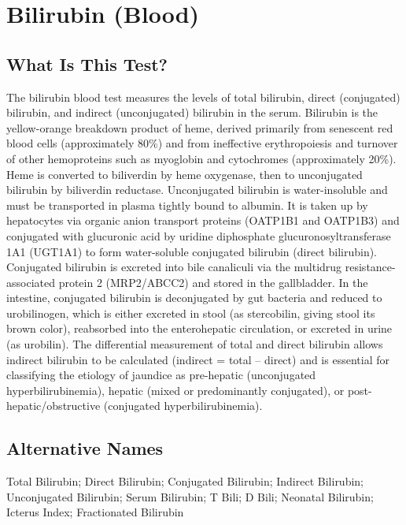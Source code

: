 \chapter{Bilirubin (Blood)}

\section*{What Is This Test?}
The bilirubin blood test measures the levels of total bilirubin, direct (conjugated) bilirubin, and indirect (unconjugated) bilirubin in the serum. Bilirubin is the yellow-orange breakdown product of heme, derived primarily from senescent red blood cells (approximately 80\%) and from ineffective erythropoiesis and turnover of other hemoproteins such as myoglobin and cytochromes (approximately 20\%). Heme is converted to biliverdin by heme oxygenase, then to unconjugated bilirubin by biliverdin reductase. Unconjugated bilirubin is water-insoluble and must be transported in plasma tightly bound to albumin. It is taken up by hepatocytes via organic anion transport proteins (OATP1B1 and OATP1B3) and conjugated with glucuronic acid by uridine diphosphate glucuronosyltransferase 1A1 (UGT1A1) to form water-soluble conjugated bilirubin (direct bilirubin). Conjugated bilirubin is excreted into bile canaliculi via the multidrug resistance-associated protein 2 (MRP2/ABCC2) and stored in the gallbladder. In the intestine, conjugated bilirubin is deconjugated by gut bacteria and reduced to urobilinogen, which is either excreted in stool (as stercobilin, giving stool its brown color), reabsorbed into the enterohepatic circulation, or excreted in urine (as urobilin). The differential measurement of total and direct bilirubin allows indirect bilirubin to be calculated (indirect = total -- direct) and is essential for classifying the etiology of jaundice as pre-hepatic (unconjugated hyperbilirubinemia), hepatic (mixed or predominantly conjugated), or post-hepatic/obstructive (conjugated hyperbilirubinemia).

\section*{Alternative Names}
Total Bilirubin; Direct Bilirubin; Conjugated Bilirubin; Indirect Bilirubin; Unconjugated Bilirubin; Serum Bilirubin; T Bili; D Bili; Neonatal Bilirubin; Icterus Index; Fractionated Bilirubin

